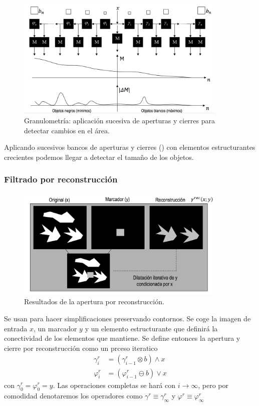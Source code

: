 \documentclass[nochap,palatino,notitlepage]{apuntes}
\begin{document}
\begin{figure}[hbtp]
\centering
\includegraphics[width=0.9\textwidth]{img/Granulometria.png}
\caption{Granulometría: aplicación sucesiva de aperturas y cierres para detectar cambios en el área.}
\label{fig:Granulometria}
\end{figure}

Aplicando sucesivos bancos de aperturas y cierres () con elementos estructurantes crecientes podemos llegar a detectar el tamaño de los objetos.

\subsubsection{Filtrado por reconstrucción}

\begin{figure}[hbtp]
\centering
\includegraphics[width=0.9\textwidth]{img/AperturaReconstruccion.png}
\caption{Resultados de la apertura por reconstrucción.}
\label{fig:AperturaReconstruccion}
\end{figure}

Se usan para hacer simplificaciones preservando contornos. Se coge la imagen de entrada $x$, un marcador $y$ y un elemento estructurante que definirá la conectividad de los elementos que mantiene. Se define entonces la apertura y cierre por reconstrucción como un prceso iteratico\begin{align*}
γ^r_i &= (γ^r_{i-1} \otimes b) \wedge x \\
φ^r_i &= (φ^r_{i-1} \ominus b) \vee x
\end{align*} con $γ^r_0 = φ^r_0 = y$. Las operaciones completas se hará con $i \to ∞$, pero por comodidad denotaremos los operadores como $γ^r \equiv γ^r_{∞}$ y $φ^r \equiv φ^r_{∞}$
\end{document}
